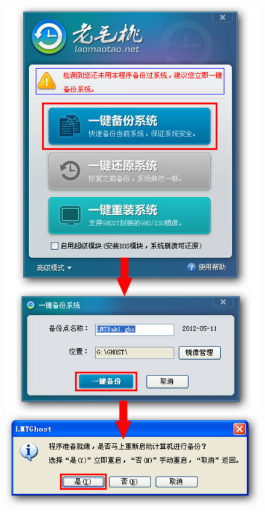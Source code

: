 \begin{itemize}
\begin{enumerate}
\begin{figure}[!htbp]
		\includegraphics[scale=0.40]{figs/win_lmt_backup_startup.pdf}
    	\label{fig:win_lmt_backup_startup}
\end{figure}


\end{enumerate}
\end{itemize}
